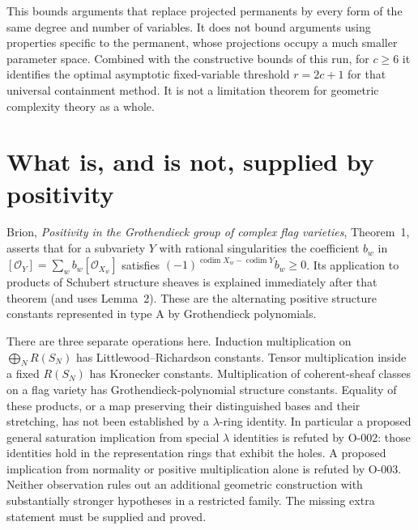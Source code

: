 This bounds arguments that replace projected permanents by every
form of the same degree and number of variables. It does not bound
arguments using properties specific to the permanent, whose
projections occupy a much smaller parameter space. Combined with
the constructive bounds of this run, for $c\geq6$ it identifies
the optimal asymptotic fixed-variable threshold $r=2c+1$ for that
universal containment method. It is not a limitation theorem for
geometric complexity theory as a whole.



















\section{What is, and is not, supplied by positivity}

Brion, \emph{Positivity in the Grothendieck group of complex flag
varieties}, Theorem~1, asserts that for a subvariety $Y$ with rational
singularities the coefficient $b_w$ in
$[\mathcal O_Y]=\sum_w b_w[\mathcal O_{X_w}]$ satisfies
$(-1)^{\operatorname{codim}X_w-\operatorname{codim}Y}b_w\geq0$.
Its application to products of Schubert structure sheaves is explained
immediately after that theorem (and uses Lemma~2). These are the
alternating positive structure constants represented in type A by
Grothendieck polynomials.

There are three separate operations here. Induction multiplication on
$\bigoplus_N R(S_N)$ has Littlewood--Richardson constants. Tensor
multiplication inside a fixed $R(S_N)$ has Kronecker constants.
Multiplication of coherent-sheaf classes on a flag variety has
Grothendieck-polynomial structure constants. Equality of these
products, or a map preserving their distinguished bases and their
stretching, has not been established by a $\lambda$-ring identity.
In particular a proposed general saturation implication from special
$\lambda$ identities is refuted by O-002: those identities hold in
the representation rings that exhibit the holes.  A proposed
implication from normality or positive multiplication alone is refuted
by O-003. Neither observation rules out an additional geometric
construction with substantially stronger hypotheses in a restricted
family. The missing extra statement must be supplied and proved.

